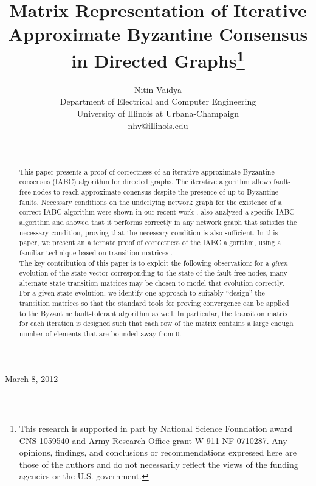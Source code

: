 \documentclass[letterpaper, 12pt]{article}
\title{Matrix Representation of Iterative Approximate Byzantine Consensus in Directed Graphs\thanks{This research is supported
in part by
 National
Science Foundation award CNS 1059540 and Army Research Office grant W-911-NF-0710287. Any opinions, findings, and conclusions or recommendations expressed here are those of the authors and do not
necessarily reflect the views of the funding agencies or the U.S. government.}
}
\author{Nitin Vaidya\\ Department of Electrical and Computer Engineering\\ University of Illinois at Urbana-Champaign\\ nhv@illinois.edu}
\begin{document}
\date{~}

\maketitle

\centerline{March 8, 2012}

~

\begin{abstract}
This paper presents a proof of correctness of an iterative
approximate Byzantine
consensus (IABC) algorithm for directed graphs. The iterative algorithm allows
fault-free nodes to reach approximate conensus despite the presence of up
to  Byzantine faults. Necessary conditions on the underlying network
graph for the existence of a correct IABC algorithm were shown in our
recent work \cite{IBA_sync,us}. \cite{IBA_sync} also analyzed
a specific IABC algorithm and showed that it performs correctly in any
network graph that satisfies the necessary condition, proving that the
necessary condition is also sufficient. In this paper, we present an 
alternate proof of correctness of the IABC algorithm, using a familiar
technique based on transition matrices \cite{jadbabaie_consensus,Benezit,vaidyaII,Zhang}.\\

The key contribution of this paper is to exploit the
following observation: for a {\em given} evolution of the state vector
corresponding to the state of the fault-free nodes, 
many alternate state transition matrices may be chosen to model
that evolution correctly. For a given state evolution, we identify one approach
to suitably ``design'' the transition matrices so that the standard tools
for proving convergence can be applied to the Byzantine fault-tolerant
algorithm as well.
In particular, the transition matrix for each iteration
is designed such that each row of the matrix contains a large enough number
of elements that are bounded away from 0. \\


\end{abstract}







\newcommand{\deltaC}{\delta_{N_i^*[t]}}
\newcommand{\bfA}{{\bf A}}
\newcommand{\bfB}{{\bf B}}
\newcommand{\bfC}{{\bf C}}
\newcommand{\bfG}{{\bf G}}
\newcommand{\bfH}{{\bf H}}
\newcommand{\bfK}{{\bf K}}
\newcommand{\bfM}{{\bf M}}
\newcommand{\bfP}{{\bf P}}
\newcommand{\bfQ}{{\bf Q}}
\newcommand{\bfv}{{\bf v}}
\newcommand{\sH}{\mathcal{H}}
\newcommand{\T}[1]{\overline{#1}}
\end{document}
